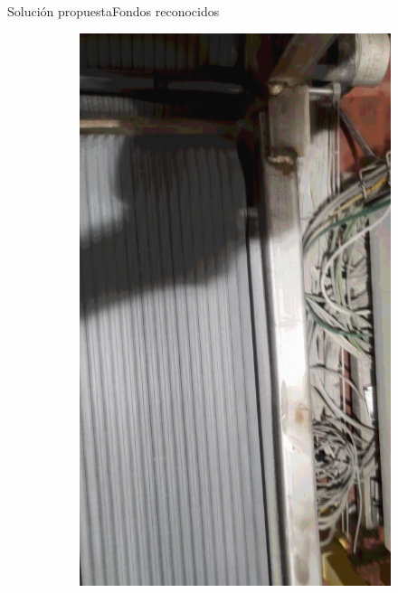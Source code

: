 \documentclass{beamer}
\begin{document}
\begin{frame}{Solución propuesta}{Fondos reconocidos}
\begin{figure}
    \begin{subfigure}[b]{0.3\textwidth}
        \includegraphics[width=\textwidth]{img/F2.png}
    \end{subfigure}
    \begin{subfigure}[b]{0.3\textwidth}

\end{subfigure}
\end{figure}
\end{frame}
\end{document}
